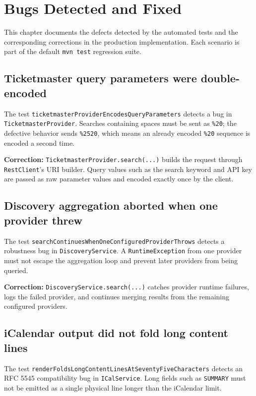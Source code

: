 \chapter{Bugs Detected and Fixed} \label{cap:bugs}

This chapter documents the defects detected by the automated tests and the corresponding corrections in the production implementation. Each scenario is part of the default \texttt{mvn test} regression suite.

\section{Ticketmaster query parameters were double-encoded}

The test \texttt{ticketmasterProviderEncodesQueryParameters} detects a bug in \texttt{TicketmasterProvider}. Searches containing spaces must be sent as \texttt{\%20}; the defective behavior sends \texttt{\%2520}, which means an already encoded \texttt{\%20} sequence is encoded a second time.

\textbf{Correction:} \texttt{TicketmasterProvider.search(...)} builds the request through \texttt{RestClient}'s URI builder. Query values such as the search keyword and API key are passed as raw parameter values and encoded exactly once by the client.

\section{Discovery aggregation aborted when one provider threw}

The test \texttt{searchContinuesWhenOneConfiguredProviderThrows} detects a robustness bug in \texttt{DiscoveryService}. A \texttt{RuntimeException} from one provider must not escape the aggregation loop and prevent later providers from being queried.

\textbf{Correction:} \texttt{DiscoveryService.search(...)} catches provider runtime failures, logs the failed provider, and continues merging results from the remaining configured providers.

\section{iCalendar output did not fold long content lines}

The test \texttt{renderFoldsLongContentLinesAtSeventyFiveCharacters} detects an RFC 5545 compatibility bug in \texttt{ICalService}. Long fields such as \texttt{SUMMARY} must not be emitted as a single physical line longer than the iCalendar limit.

